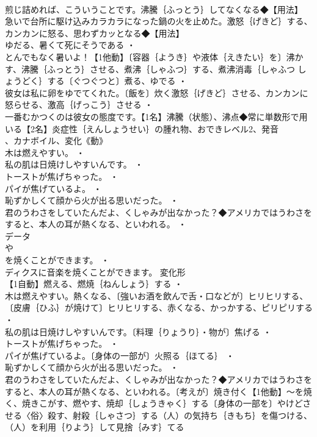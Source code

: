 \documentclass[8pt]{extreport}
\begin{document}
\begin{CJK}{UTF8}{min}
\\	煎じ詰めれば、こういうことです。沸騰｛ふっとう｝してなくなる◆【用法】
\\	急いで台所に駆け込みカラカラになった鍋の火を止めた。激怒｛げきど｝する、カンカンに怒る、思わずカッとなる◆【用法】
\\	ゆだる、暑くて死にそうである ・
\\	とんでもなく暑いよ！【1他動】〔容器｛ようき｝や液体｛えきたい｝を〕沸かす、沸騰｛ふっとう｝させる、煮沸｛しゃふつ｝する、煮沸消毒｛しゃふつ しょうどく｝する〔ぐつぐつと〕煮る、ゆでる ・
\\	彼女は私に卵をゆでてくれた。〔飯を〕炊く激怒｛げきど｝させる、カンカンに怒らせる、激高｛げっこう｝させる ・
\\	一番むかつくのは彼女の態度です。【1名】沸騰（状態）、沸点◆常に単数形で用いる【2名】炎症性｛えんしょうせい｝の腫れ物、おできレベル2、発音
\\	、カナボイル、変化《動》
\\	木は燃えやすい。 ・
\\	私の肌は日焼けしやすいんです。 ・
\\	トーストが焦げちゃった。 ・
\\	パイが焦げているよ。 ・
\\	恥ずかしくて顔から火が出る思いだった。 ・
\\	君のうわさをしていたんだよ、くしゃみが出なかった？◆アメリカではうわさをすると、本人の耳が熱くなる、といわれる。 ・
\\	データ
\\	や
\\	を焼くことができます。 ・
\\	ディクスに音楽を焼くことができます。	変化形 
\\	【1自動】燃える、燃焼｛ねんしょう｝する ・
\\	木は燃えやすい。熱くなる、〔強いお酒を飲んで舌・口などが〕ヒリヒリする、〔皮膚｛ひふ｝が焼けて〕ヒリヒリする、赤くなる、かっかする、ピリピリする ・
\\	私の肌は日焼けしやすいんです。〔料理｛りょうり｝・物が〕焦げる ・
\\	トーストが焦げちゃった。 ・
\\	パイが焦げているよ。〔身体の一部が〕火照る｛ほてる｝ ・
\\	恥ずかしくて顔から火が出る思いだった。 ・
\\	君のうわさをしていたんだよ、くしゃみが出なかった？◆アメリカではうわさをすると、本人の耳が熱くなる、といわれる。〔考えが〕焼き付く【1他動】～を焼く、焼きこがす、燃やす、焼却｛しょうきゃく｝する〔身体の一部を〕やけどさせる〈俗〉殺す、射殺｛しゃさつ｝する（人）の気持ち｛きもち｝を傷つける、（人）を利用｛りよう｝して見捨｛みす｝てる

\end{CJK}
\end{document}
